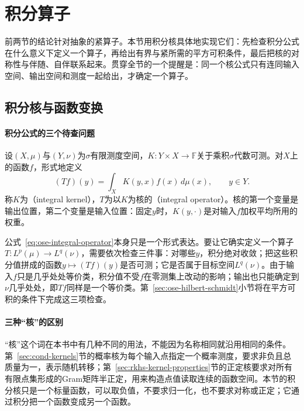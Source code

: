 
\section{积分算子}
\label{sec:ose-integral-operators}

前两节的结论针对抽象的紧算子。本节用积分核具体地实现它们：先检查积分公式在什么意义下定义一个算子，再给出有界与紧所需的平方可积条件，最后把核的对称性与伴随、自伴联系起来。贯穿全节的一个提醒是：同一个核公式只有连同输入空间、输出空间和测度一起给出，才确定一个算子。

\subsection{积分核与函数变换}
\label{sec:ose-kernels}

\paragraph{积分公式的三个待查问题}
设$(X,\mu)$与$(Y,\nu)$为$\sigma$有限测度空间，$K:Y\times X\to\mathbb F$关于乘积$\sigma$代数可测。对$X$上的函数$f$，形式地定义
\begin{equation}
  (Tf)(y)=\int_XK(y,x)f(x)\,d\mu(x),\qquad y\in Y .
  \label{eq:ose-integral-operator}
\end{equation}
称$K$为（integral kernel），$T$为以$K$为核的（integral operator）。核的第一个变量是输出位置，第二个变量是输入位置：固定$y$时，$K(y,\cdot)$是对输入$f$加权平均所用的权重。

公式~\eqref{eq:ose-integral-operator}本身只是一个形式表达。要让它确实定义一个算子$T:L^p(\mu)\to L^q(\nu)$，需要依次检查三件事：对哪些$y$，积分绝对收敛；把这些积分值拼成的函数$y\mapsto(Tf)(y)$是否可测；它是否属于目标空间$L^q(\nu)$。由于输入$f$只是几乎处处等价类，积分值不受$f$在零测集上改动的影响；输出也只能确定到$\nu$几乎处处，即$Tf$同样是一个等价类。第~\ref{sec:ose-hilbert-schmidt}小节将在平方可积的条件下完成这三项检查。

\paragraph{三种“核”的区别}
“核”这个词在本书中有几种不同的用法，不能因为名称相同就沿用相同的条件。第~\ref{sec:cond-kernels}节的概率核为每个输入点指定一个概率测度，要求非负且总质量为一，表示随机转移；第~\ref{sec:rkhs-kernel-properties}节的正定核要求对所有有限点集形成的Gram矩阵半正定，用来构造点值读取连续的函数空间。本节的积分核只是一个标量函数，可以取负值，不要求归一化，也不要求对称或正定；它通过积分把一个函数变成另一个函数。

